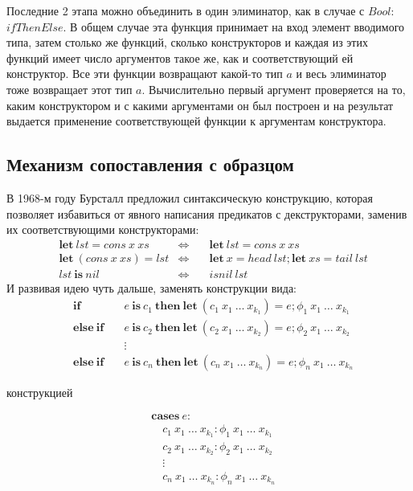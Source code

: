 Последние 2 этапа можно объединить в один элиминатор, как в случае с \(Bool\):
\(ifThenElse\). В общем случае эта функция принимает на вход элемент вводимого
типа, затем столько же функций, сколько конструкторов и каждая из этих функций
имеет число аргументов такое же, как и соответствующий ей конструктор. Все эти
функции возвращают какой-то тип \(a\) и весь элиминатор тоже возвращает этот тип \(a\).
Вычислительно первый аргумент проверяется на то, каким конструктором и с какими
аргументами он был построен и на результат выдается применение соответствующей
функции к аргументам конструктора.

\subsection{Механизм сопоставления с образцом}

В 1968-м году Бурсталл\cite{proving-properties-of-programs-by-structural-induction}
предложил синтаксическую конструкцию, которая позволяет избавиться от явного написания
предикатов с декструкторами, заменив их соответствующими конструкторами:
\begin{align*}
&\mathbf{let}\ lst = cons\ x\ xs &\Leftrightarrow &\quad\mathbf{let}\ lst = cons\ x\ xs\\
&\mathbf{let}\ (cons\ x\ xs) = lst &\Leftrightarrow
   &\quad\mathbf{let}\ x = head\ lst; \mathbf{let}\ xs = tail\ lst\\
&lst\ \mathbf{is}\ nil &\Leftrightarrow &\quad isnil\ lst
\end{align*}
И развивая идею чуть дальше, заменять конструкции вида:
\begin{align*}
&\mathbf{if}\ &&e\ \mathbf{is}\ c_1\ \mathbf{then\ let}\ (c_1\ x_1\ \dots\ x_{k_1}) = e;
   \phi_1\ x_1\ \dots\ x_{k_1}\\
&\mathbf{else\ if}\ &&e\ \mathbf{is}\ c_2\ \mathbf{then\ let}\ (c_2\ x_1\ \dots\ x_{k_2}) = e;
   \phi_2\ x_1\ \dots\ x_{k_2}\\
&&&\vdots\\
&\mathbf{else\ if}\ &&e\ \mathbf{is}\ c_n\ \mathbf{then\ let}\ (c_n\ x_1\ \dots\ x_{k_n}) = e;
   \phi_n\ x_1\ \dots\ x_{k_n}
\end{align*}

конструкцией

\begin{align*}
&\mathbf{cases}\ e:\\
&\quad c_1\ x_1\ \dots\ x_{k_1}: \phi_1\ x_1\ \dots\ x_{k_1}\\
&\quad c_2\ x_1\ \dots\ x_{k_2}: \phi_2\ x_1\ \dots\ x_{k_2}\\
&\quad\vdots\\
&\quad c_n\ x_1\ \dots\ x_{k_n}: \phi_n\ x_1\ \dots\ x_{k_n}
\end{align*}

